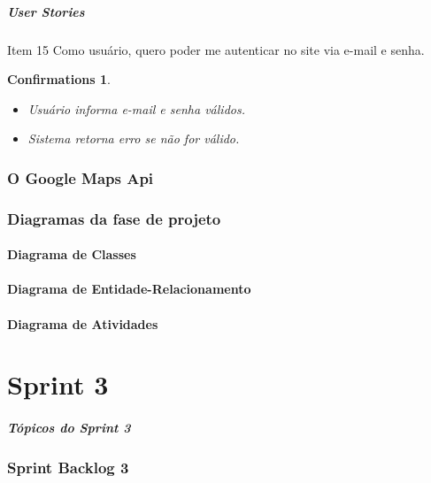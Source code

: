 \documentclass[12pt,a4paper]{beamer}
\newtheorem{confirmations}[theorem]{Confirmations}
\begin{document}
			\begin{frame}
				\frametitle{User Stories}	
				\begin{block}{Item 15}
					Como usuário, quero poder me autenticar no site via e-mail e senha.
					
					\begin{confirmations}
						\begin{itemize}
							\item Usuário informa e-mail e senha válidos.
							\item Sistema retorna erro se não for válido.
						\end{itemize}
					\end{confirmations}
				\end{block}
			\end{frame}			
			
			
				
		\section{O Google Maps Api}
		\section{Diagramas da fase de projeto}
			\subsection{Diagrama de Classes}
			\subsection{Diagrama de Entidade-Relacionamento}
			\subsection{Diagrama de Atividades}
	\part{Sprint 3}
	
		\begin{frame}
			\frametitle{Tópicos do Sprint 3}
			\tableofcontents[pausesections]
		\end{frame}	
	
		\section{Sprint Backlog 3}
\end{document}
